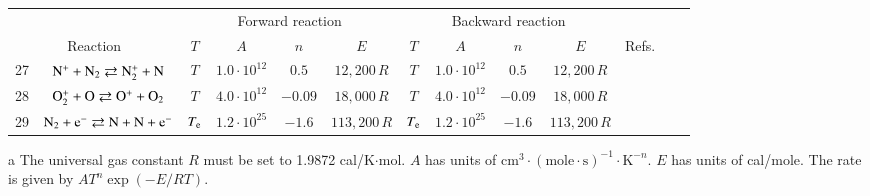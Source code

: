 \documentclass{warpdoc}
\renewcommand{\fontsizetable}{\footnotesize\scalefont{0.9}}
\begin{document}
\begin{table}[t]
\fontsizetable
\begin{center}
\begin{threeparttable}
\begin{tabular}{ccccccccccccc} 
\toprule
~&~&\multicolumn{4}{c}{Forward reaction} & \multicolumn{4}{c}{Backward reaction} & ~\\
 \cmidrule(lr){3-6}\cmidrule(lr){7-10}
\multicolumn{2}{c}{Reaction} & $T$ & $A$ & $n$ & $E$ & $T$  & $A$ & $n$ & $E$ & \multicolumn{1}{c}{Refs.}\\ 
\midrule                                          
27 & $\rm N^{+} + N_2 \rightleftarrows N_2^{+} + N $ &$T$ & $1.0 \cdot 10^{12}$ & $0.5$ & $12,200\, R$ 
                                          &$T$ & $1.0 \cdot 10^{12}$ & $0.5$ & $12,200\, R$ & \cite{book:1990:park} \\
                                          
28 & $\rm O_2^{+} + O \rightleftarrows O^{+} + O_2$ &$T$ & $4.0 \cdot 10^{12}$ & $-0.09$ & $18,000\, R$ 
                                          &$T$ & $4.0 \cdot 10^{12}$ & $-0.09$ & $18,000\, R$ & \cite{book:1990:park} \\
                                          
                                          
29 & $\rm N_2 + e^{-} \rightleftarrows N + N + e^{-}$ &$T_{\rm e}$ & $1.2 \cdot 10^{25}$ & $-1.6$ & $113,200\, R$ 
                                          &$T_{\rm e}$ & $1.2 \cdot 10^{25}$ & $-1.6$ & $113,200\, R$ & \cite{aiaaconf:1991:sharma} \\
                                          
                                          
\bottomrule
\end{tabular}
\begin{tablenotes}
\item[{a}] The universal gas constant $R$ must be set to 1.9872	cal/K$\cdot$mol. $A$ has units of $\textrm{cm}^3\cdot(\textrm{mole}\cdot \textrm{s})^{-1}\cdot \textrm{K}^{-n}$. $E$ has units of cal/mole. The rate is given by $A T^n \exp(-E/RT).$
\end{tablenotes}
\label{tab:thoguluva2023b}
\end{threeparttable}
\end{center}
\end{table}
%


~
\newpage
~
\newpage
~
~
\newpage
~
\newpage
~
\newpage
~
\newpage
~
\newpage
~
\newpage
~
\newpage
~
\newpage
~
\newpage



\end{document}

